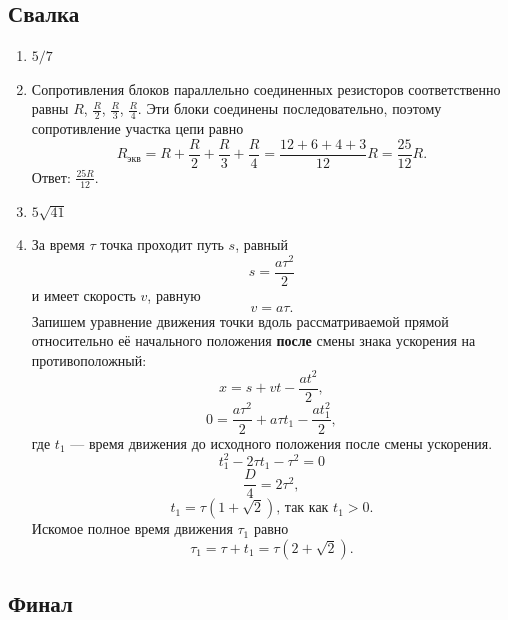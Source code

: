 \documentclass[12pt]{article} %
\begin{document}
\subsection*{Свалка}

\begin{enumerate}
\item $5/7$
\item Сопротивления блоков параллельно соединенных резисторов соответственно равны $R$, $\frac{R}{2}$, $\frac{R}{3}$, $\frac{R}{4}$. Эти блоки соединены последовательно, поэтому сопротивление участка цепи равно
\[
    R_{\text{экв}} = R + \frac{R}{2} + \frac{R}{3} + \frac{R}{4} = \frac{12+6+4+3}{12}R = \frac{25}{12}R.
\]
Ответ: $\frac{25R}{12}$.
\item $5\sqrt{41}$ 
\item         За время $\tau$ точка проходит путь $s$, равный
\[
    s = \frac{a\tau ^2}{2}
\]
и имеет скорость $v$, равную
\[
    v = a \tau.
\]
Запишем уравнение движения точки вдоль рассматриваемой прямой относительно её начального положения \textbf{после} смены знака ускорения на противоположный:
\[
    x = s + vt - \frac{at^2}{2},
\]
\[
    0 = \frac{a\tau ^2}{2} + a \tau t_1 - \frac{at_1^2}{2},
\]
где $t_1$ — время движения до исходного положения после смены ускорения.
\[
    t_1^2 - 2\tau t_1 - \tau ^2 = 0
\]
\[
    \frac{D}{4} =2 \tau ^2,
\]
\[
    t_1 = \tau (1 + \sqrt{2})\text{, так как $t_1 > 0$}.
\]
Искомое полное время движения $\tau _1$ равно 
\[
    \tau _1 = \tau + t_1 = \tau (2 + \sqrt{2}).
\]
\end{enumerate}
    
\subsection*{Финал}
\end{document}
